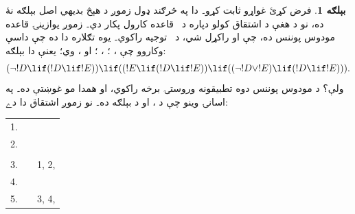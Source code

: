 \documentclass[12pt,a4paper,oneside]{report}
\makeatletter
\renewcommand{\MP}{\LR{\latinfont MP}}
\theoremstyle{definition}
\newtheorem{ex}[thm]{بېلګه}
\newenvironment{derivation}{%
  \par\smallskip\begin{LTR}\begin{tabular}{@{}rll@{}}}
  {\end{tabular}\end{LTR}\par\smallskip}
\makeatother
\begin{document}
\label{olpseg:OLP-0116-B006:start}
\begin{ex}
فرض کړئ غواړو  ثابت کړو۔
دا په څرګند ډول زموږ د هېڅ بديهي اصل بېلګه نۀ ده، نو د هغې د
اشتقاق کولو دپاره د~\MP{} قاعده کارول پکار دي۔ زموږ يوازينۍ
قاعده مودوس پوننس ده، چې  او  راکړل شي، د~
توجيه راکوي۔ يوه تګلاره دا ده چې  داسې وکاروو
چې ، ؛ ، ؛ او ،  وي؛ يعنې
دا بېلګه:
\[
(\lnot !D \lif (!D \lif !E)) \lif ((!E \lif (!D \lif !E)) \lif ((\lnot
!D \lor !E) \lif (!D \lif !E))).
\]
ولې؟ د مودوس پوننس دوه تطبيقونه وروستۍ برخه راکوي، او همدا مو
غوښتې ده۔ په اسانۍ وينو چې  د
، او  د
 بېلګه ده۔ نو زموږ اشتقاق دا دے:
\begin{derivation}
  1. &  \LR{$\lnot !D \lif (!D \lif !E)$} & \olref[prp]{ax:lnot2} \\
  2. & \LR{$(\lnot !D \lif (!D \lif !E)) \lif {}$}\\
  &\qquad \LR{$((!E \lif (!D \lif !E)) \lif ((\lnot !D \lor !E) \lif (!D \lif !E)))$} & \olref[prp]{ax:lor3}\\
  3. & \LR{$(!E \lif (!D \lif !E)) \lif ((\lnot !D \lor !E) \lif (!D \lif !E))$} & 1, 2, \MP\\
  4. & \LR{$!E \lif (!D \lif !E)$} & \olref[prp]{ax:lif1}\\
  5. & \LR{$(\lnot !D \lor !E) \lif (!D \lif !E)$} & 3, 4, \MP
\end{derivation}
\end{ex}
\label{olpseg:OLP-0116-B006:end}
\end{document}
